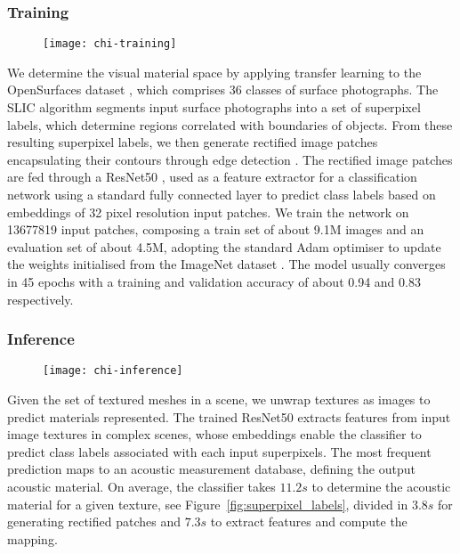 \subsubsection{Training}
\begin{figure}[htbp]
    \centering
    \texttt{[image: chi-training]}
    \caption{}
    \label{fig:chi-inference}
\end{figure}
We determine the visual material space by applying transfer learning to the OpenSurfaces dataset \cite{bell2013opensurfaces}, which comprises 36 classes of surface photographs. 
The SLIC algorithm \cite{slic6205760} segments input surface photographs into a set of superpixel labels, which determine regions correlated with boundaries of objects. From these resulting superpixel labels, we then generate rectified image patches encapsulating their contours through edge detection \cite{ding2001canny}.
The rectified image patches are fed through a ResNet50 \cite{he2016deep}, used as a feature extractor for a classification network using a standard fully connected layer to predict class labels based on embeddings of 32 pixel resolution input patches. We train the network on 13677819 input patches, composing a train set of about 9.1M images and an evaluation set of about 4.5M, adopting the standard Adam optimiser \cite{kingma2014adam} to update the weights initialised from the ImageNet dataset \cite{deng2009imagenet}. The model usually converges in 45 epochs with a training and validation accuracy of about 0.94 and 0.83 respectively. 

\subsubsection{Inference}
\begin{figure}[htbp]
    \centering
    \texttt{[image: chi-inference]}
    \caption{}
    \label{fig:chi-inference}
\end{figure}
Given the set of textured meshes in a scene, we unwrap textures as images to predict materials represented. The trained ResNet50 extracts features from input image textures in complex scenes, whose embeddings enable the classifier to predict class labels associated with each input superpixels. The most frequent prediction maps to an acoustic measurement database, defining the output acoustic material. On average, the classifier takes $11.2s$ to determine the acoustic material for a given texture, see Figure~\ref{fig:superpixel_labels}, divided in $3.8s$ for generating rectified patches and $7.3s$ to extract features and compute the mapping.%

